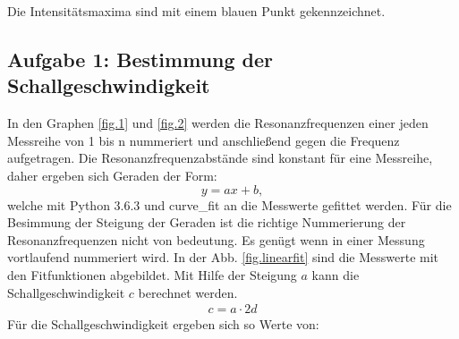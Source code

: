 Die Intensitätsmaxima sind mit einem blauen Punkt gekennzeichnet.
\FloatBarrier

\subsection{Aufgabe 1: Bestimmung der Schallgeschwindigkeit}
\FloatBarrier
In den Graphen \ref{fig.1} und \ref{fig.2} %
werden die Resonanzfrequenzen einer jeden Messreihe von 1 bis n nummeriert und anschließend gegen die Frequenz aufgetragen.
Die Resonanzfrequenzabstände sind konstant für eine Messreihe, daher ergeben sich Geraden der Form:
\begin{equation*}
  y=ax+b,
\end{equation*}
welche mit Python 3.6.3 und curve\_fit an die Messwerte gefittet werden.
Für die Besimmung der Steigung der Geraden ist die richtige Nummerierung der Resonanzfrequenzen nicht von bedeutung.
Es genügt wenn in einer Messung vortlaufend nummeriert wird.
In der Abb. \ref{fig.linearfit} sind die Messwerte mit den Fitfunktionen abgebildet.
Mit Hilfe der Steigung $a$ kann die Schallgeschwindigkeit $c$ berechnet werden.
\begin{align*}
  c = a\cdot2d
\end{align*}
Für die Schallgeschwindigkeit ergeben sich so Werte von:
